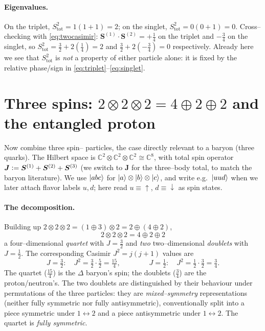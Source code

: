 \documentclass[11pt,oneside]{article}
\newcommand{\C}{\mathbb{C}}
\newcommand{\eqdef}{\vcentcolon=}
\newcommand{\up}{\uparrow}
\newcommand{\down}{\downarrow}
\begin{document}
\paragraph{Eigenvalues.}
On the triplet, $S_{\mathrm{tot}}^2 = 1(1+1) = 2$; on the singlet,
$S_{\mathrm{tot}}^2 = 0(0+1) = 0$. Cross--checking with
\eqref{eq:twocasimir}: $\bm S^{(1)}\!\cdot\bm S^{(2)} = +\tfrac14$ on the
triplet and $-\tfrac34$ on the singlet, so
$S^2_{\mathrm{tot}} = \tfrac32 + 2(\tfrac14) = 2$ and
$\tfrac32 + 2(-\tfrac34) = 0$ respectively. Already here we see that
$S^2_{\mathrm{tot}}$ is \emph{not} a property of either particle alone: it is
fixed by the relative phase/sign in \eqref{eq:triplet}--\eqref{eq:singlet}.

\section{Three spins: $2\otimes2\otimes2 = 4\oplus2\oplus2$ and the entangled
proton}
\label{sec:threespin}

Now combine three spin--\textonehalf{} particles, the case directly relevant to
a baryon (three quarks). The Hilbert space is
$\C^2\otimes\C^2\otimes\C^2\cong\C^8$, with total spin operator
$\bm J \eqdef \bm S^{(1)}+\bm S^{(2)}+\bm S^{(3)}$ (we switch to $\bm J$ for the
three--body total, to match the baryon literature). We use $\ket{abc}$ for
$\ket a\otimes\ket b\otimes\ket c$, and write e.g.\ $\ket{uud}$ when we later
attach flavor labels $u,d$; here read $u\equiv\up$, $d\equiv\down$ as spin
states.

\paragraph{The decomposition.}
Building up $2\otimes2\otimes2 = (1\oplus3)\otimes2 = 2 \oplus (4\oplus 2)$,
\begin{equation}
  \boxed{\,2\otimes2\otimes2 = 4 \oplus 2 \oplus 2\,}
\end{equation}
a four--dimensional \emph{quartet} with $J=\tfrac32$ and \emph{two}
two--dimensional \emph{doublets} with $J=\tfrac12$. The corresponding Casimir
$J^2 = j(j+1)$ values are
\begin{equation}
  J=\tfrac32:\quad J^2 = \tfrac32\cdot\tfrac52 = \tfrac{15}{4}, \qquad\qquad
  J=\tfrac12:\quad J^2 = \tfrac12\cdot\tfrac32 = \tfrac34 .
\end{equation}
The quartet ($\tfrac{15}{4}$) is the $\Delta$ baryon's spin; the doublets
($\tfrac34$) are the proton/neutron's. The two doublets are
distinguished by their behaviour under permutations of the three particles:
they are \emph{mixed--symmetry} representations (neither fully symmetric nor
fully antisymmetric), conventionally split into a piece symmetric under
$1\!\leftrightarrow\!2$ and a piece antisymmetric under $1\!\leftrightarrow\!2$.
The quartet is \emph{fully symmetric}.
\end{document}
